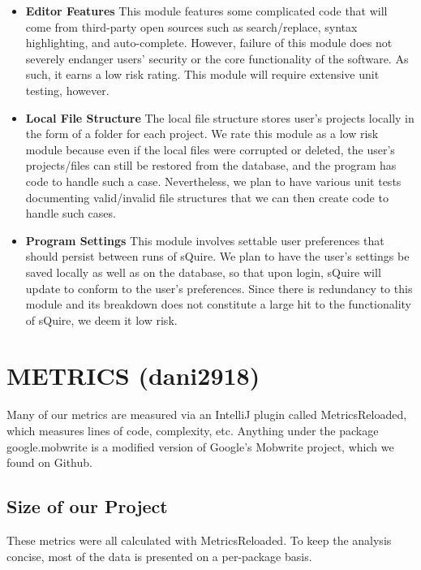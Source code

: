 \documentclass[twoside,letterpaper]{article}
\begin{document}
\begin{itemize}
	\item \textbf{Editor Features}
	This module features some complicated code that will come from third-party open sources such as search/replace, syntax highlighting, and auto-complete. However, failure of this module does not severely endanger users' security or the core functionality of the software. As such, it earns a low risk rating. This module will require extensive unit testing, however.
	\item \textbf{Local File Structure} 
	The local file structure stores user's projects locally in the form of a folder for each project. We rate this module as a low risk module because even if the local files were corrupted or deleted, the user's projects/files can still be restored from the database, and the program has code to handle such a case. Nevertheless, we plan to have various unit tests documenting valid/invalid file structures that we can then create code to handle such cases.
	\item \textbf{Program Settings} 
	This module involves settable user preferences that should persist between runs of sQuire. We plan to have the user's settings be saved locally as well as on the database, so that upon login, sQuire will update to conform to the user's preferences. Since there is redundancy to this module and its breakdown does not constitute a large hit to the functionality of sQuire, we deem it low risk.
\end{itemize}


\newpage
\section[METRICS (dani2918)]{\rmfamily\bfseries\color{black} METRICS (dani2918)}

Many of our metrics are measured via an IntelliJ plugin called MetricsReloaded, which measures lines of code, complexity, etc. Anything under the package google.mobwrite is a modified version of Google's Mobwrite project, which we found on Github.


	\subsection{Size of our Project} 
	
	These metrics were all calculated with MetricsReloaded. To keep the analysis concise, most of the data is presented on a per-package basis.
	
\end{document}
